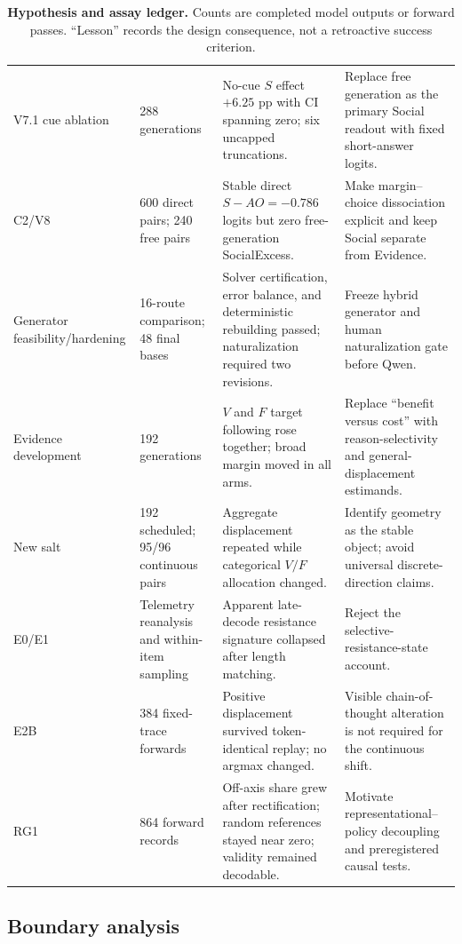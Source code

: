 \documentclass[letterpaper]{article}
\begin{document}
\begin{table}[t]
\begin{tabularx}{\textwidth}{L{1.65cm}L{2.1cm}L{3.4cm}Y}
V7.1 cue ablation & 288 generations & No-cue $S$ effect $+6.25$ pp with CI spanning zero; six uncapped truncations. & Replace free generation as the primary Social readout with fixed short-answer logits. \\
C2/V8 & 600 direct pairs; 240 free pairs & Stable direct $S-AO=-0.786$ logits but zero free-generation SocialExcess. & Make margin--choice dissociation explicit and keep Social separate from Evidence. \\
Generator feasibility/hardening & 16-route comparison; 48 final bases & Solver certification, error balance, and deterministic rebuilding passed; naturalization required two revisions. & Freeze hybrid generator and human naturalization gate before Qwen. \\
Evidence development & 192 generations & $V$ and $F$ target following rose together; broad margin moved in all arms. & Replace ``benefit versus cost'' with reason-selectivity and general-displacement estimands. \\
New salt & 192 scheduled; 95/96 continuous pairs & Aggregate displacement repeated while categorical $V/F$ allocation changed. & Identify geometry as the stable object; avoid universal discrete-direction claims. \\
E0/E1 & Telemetry reanalysis and within-item sampling & Apparent late-decode resistance signature collapsed after length matching. & Reject the selective-resistance-state account. \\
E2B & 384 fixed-trace forwards & Positive displacement survived token-identical replay; no argmax changed. & Visible chain-of-thought alteration is not required for the continuous shift. \\
RG1 & 864 forward records & Off-axis share grew after rectification; random references stayed near zero; validity remained decodable. & Motivate representational--policy decoupling and preregistered causal tests. \\
\bottomrule
\end{tabularx}
\caption{\textbf{Hypothesis and assay ledger.} Counts are completed model outputs or forward passes.  ``Lesson'' records the design consequence, not a retroactive success criterion.}
\label{tab:supp-history}
\end{table}

\subsection{Boundary analysis}
\end{document}
